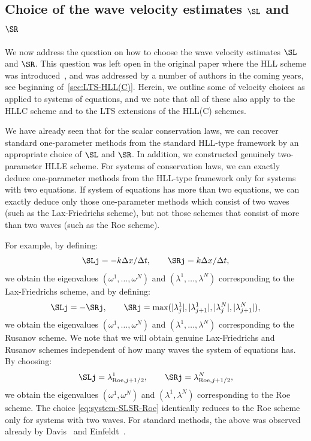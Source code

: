 \subsection{Choice of the wave velocity estimates $ \SL $ and $ \SR $}
\label{s:SLSR}

We now address the question on how to choose the wave velocity estimates $ \SL $ and $ \SR $. This question was left open in the original paper where the HLL scheme was introduced~\cite{har83a}, and was addressed by a number of authors in the coming years, see beginning of~\cref{sec:LTS-HLL(C)}. Herein, we outline some of velocity choices as applied to systems of equations, and we note that all of these also apply to the HLLC scheme and to the LTS extensions of the HLL(C) schemes.

We have already seen that for the scalar conservation laws, we can recover standard one-parameter methods from the standard HLL-type framework by an appropriate choice of $ \SL $ and $ \SR $. In addition, we constructed genuinely two-parameter HLLE scheme. For systems of conservation laws, we can exactly deduce one-parameter methods from the HLL-type framework only for systems with two equations. If system of equations has more than two equations, we can exactly deduce only those one-parameter methods which consist of two waves (such as the Lax-Friedrichs scheme), but not those schemes that consist of more than two waves (such as the Roe scheme). 

For example, by defining:
\begin{equation} \label{eq:system-SLSR-LxF}
\SLj = - k \Delta x / \Delta t, \qquad \SRj = k \Delta x / \Delta t,
\end{equation}
we obtain the eigenvalues $ (\omega^1,\dots,\omega^N) $ and $ (\lambda^1,\dots,\lambda^N) $ corresponding to the Lax-Friedrichs scheme, and by defining:
\begin{equation}
\SLj = -\SRj, \qquad
\SRj = \max ( |\lambda_j^1|,|\lambda_{j+1}^1|,|\lambda_j^N|,|\lambda_{j+1}^N| ),
\end{equation}
we obtain the eigenvalues $ (\omega^1,\dots,\omega^N) $ and $ (\lambda^1,\dots,\lambda^N) $ corresponding to the Rusanov scheme. We note that we will obtain genuine Lax-Friedrichs and Rusanov schemes independent of how many waves the system of equations has. By choosing:
\begin{equation} \label{eq:system-SLSR-Roe}
\SLj = \lambda_{\text{Roe},j+1/2}^1, \qquad
\SRj = \lambda_{\text{Roe},j+1/2}^N,
\end{equation}
we obtain the eigenvalues $ (\omega^1,\omega^N) $ and $ (\lambda^1,\lambda^N) $ corresponding to the Roe scheme. The choice \eqref{eq:system-SLSR-Roe} identically reduces to the Roe scheme only for systems with two waves. For standard methods, the above was observed already by Davis~\cite{dav88} and Einfeldt~\cite{ein88}.

